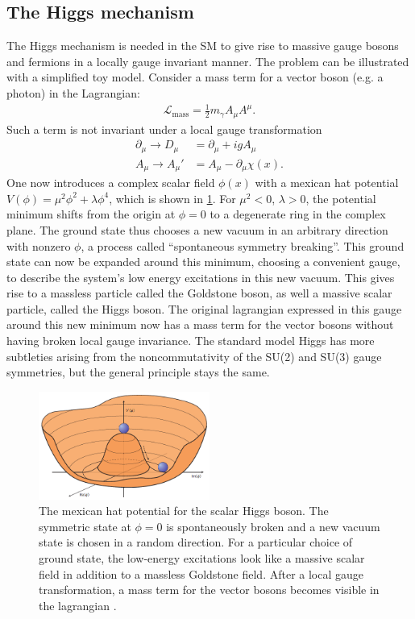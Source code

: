 \documentclass[twoside,        %
               BCOR12mm,       %
               ngerman,english, %
               fleqn,headsepline=false,footsepline=false
              ]{Vorlage/MFPREPORT}
\begin{document}
\subsection{The Higgs mechanism}
\cite[Ch. 17]{thomson}
The Higgs mechanism is needed in the SM to give rise to massive gauge bosons
and fermions in a locally gauge invariant manner.
The problem can be illustrated with a simplified toy model. Consider a mass
term for a vector boson (e.g. a photon) in the Lagrangian:
\begin{align}
    \mathcal{L}_\text{mass}=\frac{1}{2}m_\gamma A_\mu A^\mu.
    \label{eq:massterm}
\end{align}
Such a term is not invariant under a local gauge transformation
\begin{align}
    \partial_\mu\rightarrow D_\mu&=\partial_\mu+i g A_\mu\\
    A_\mu\rightarrow A_\mu'&=A_\mu-\partial_\mu \chi(x).
    \label{eq:gauge}
\end{align}
One now introduces a complex scalar field $\phi(x)$ with a mexican hat
potential $V(\phi)=\mu^2\phi^2+\lambda\phi^4$, which is shown in
\cref{fig:mexhat}. For $\mu^2<0$, $\lambda>0$, the potential minimum shifts
from the origin at $\phi=0$ to a degenerate ring in the complex plane. The
ground state thus chooses a new vacuum in an arbitrary direction with nonzero
$\phi$, a process called ``spontaneous symmetry breaking''. This ground state
can now be expanded around this minimum, choosing a convenient gauge, to
describe the system's low energy excitations in this new vacuum. This gives
rise to a massless particle called the Goldstone boson, as well a massive scalar
particle, called the Higgs boson. The original lagrangian expressed in this
gauge around this new minimum now has a mass term for the vector bosons without
having broken local gauge invariance.
The standard model Higgs has more subtleties arising from the noncommutativity
of the SU(2) and SU(3) gauge symmetries, but the general principle stays the
same.


\begin{figure}[]
    \centering
    \includegraphics[width=0.5\textwidth]{fig/higgspotential}
    \caption{The mexican hat potential for the scalar Higgs boson. The
    symmetric state at $\phi=0$ is spontaneously broken and a new vacuum state
is chosen in a random direction. For a particular choice of ground state, the
low-energy excitations look like a massive scalar field in addition to a
massless Goldstone field. After a local gauge transformation, a mass term
for the vector bosons becomes visible in the lagrangian \cite{mexhat}.}
    \label{fig:mexhat}
\end{figure}
\end{document}

